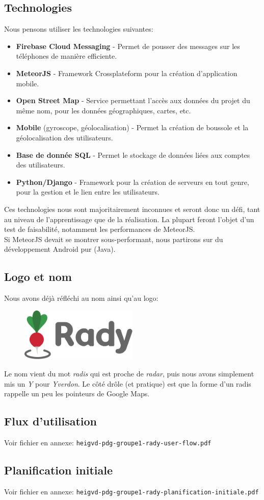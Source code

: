\documentclass[french]{article}
\begin{document}
		\subsection{Technologies}
		\label{subsec:technologies}
			Nous pensons utiliser les technologies suivantes:
			\begin{itemize}
				\item \textbf{Firebase Cloud Messaging} - Permet de pousser des messages sur les téléphones de manière efficiente.
				\item \textbf{MeteorJS} - Framework Crossplateform pour la création d'application mobile.
				\item \textbf{Open Street Map} - Service permettant l'accès aux données du projet du même nom, pour les données géographiques, cartes, etc.
				\item \textbf{Mobile} (gyroscope, géolocalisation) - Permet la création de boussole et la géolocalisation des utilisateurs.
				\item \textbf{Base de donnée SQL} - Permet le stockage de données liées aux comptes des utilisateurs.
				\item \textbf{Python/Django} - Framework pour la création de serveurs en tout genre, pour la gestion et le lien entre les utilisateurs. \\
			\end{itemize}
		
			Ces technologies nous sont majoritairement inconnues et seront donc un défi, tant au niveau de l'apprentissage que de la réalisation. La plupart feront l'objet d'un test de faisabilité, notamment les performances de MeteorJS.\\
			
			Si MeteorJS devait se montrer sous-performant, nous partirons sur du développement Android pur (Java).
			
		\subsection{Logo et nom}
			Nous avons déjà réfléchi au nom ainsi qu'au logo:
			\begin{figure}[H]
				\centering
				\includegraphics[width=0.5\textwidth]{../logo/logo}
			\end{figure}
			Le nom vient du mot \textit{radis} qui est proche de \textit{radar}, puis nous avons simplement mis un \textit{Y} pour \textit{Yverdon}. Le côté drôle (et pratique) est que la forme d'un radis rappelle un peu les pointeurs de Google Maps.
		
		\subsection{Flux d'utilisation}
		\label{subsec:userflow}
			Voir fichier en annexe: \texttt{heigvd-pdg-groupe1-rady-user-flow.pdf}
		
		\subsection{Planification initiale}
			Voir fichier en annexe: \texttt{heigvd-pdg-groupe1-rady-planification-initiale.pdf}
			
\end{document}
